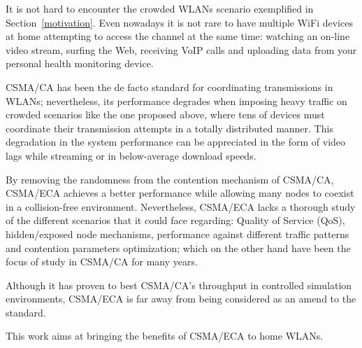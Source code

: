 It is not hard to encounter the crowded WLANs scenario exemplified in Section~\ref{motivation}. Even nowadays it is not rare to have multiple WiFi devices at home attempting to access the channel at the same time: watching an on-line video stream, surfing the Web, receiving VoIP calls and uploading data from your personal health monitoring device.

CSMA/CA has been the de facto standard for coordinating transmissions in WLANs; nevertheless, its performance degrades when imposing heavy traffic on crowded scenarios like the one proposed above, where tens of devices must coordinate their transmission attempts in a totally distributed manner. This degradation in the system performance can be appreciated in the form of video lags while streaming or in below-average download speeds.

By removing the randomness from the contention mechanism of CSMA/CA, CSMA/ECA achieves a better performance while allowing many nodes to coexist in a collision-free environment. Nevertheless, CSMA/ECA lacks a thorough study of the different scenarios that it could face regarding: Quality of Service (QoS), hidden/exposed node mechanisms, performance against different traffic patterns and contention parameters optimization; which on the other hand have been the focus of study in CSMA/CA for many years.

Although it has proven to best CSMA/CA's throughput in controlled simulation environments, CSMA/ECA is far away from being considered as an amend to the standard.

This work aims at bringing the benefits of CSMA/ECA to home WLANs. 